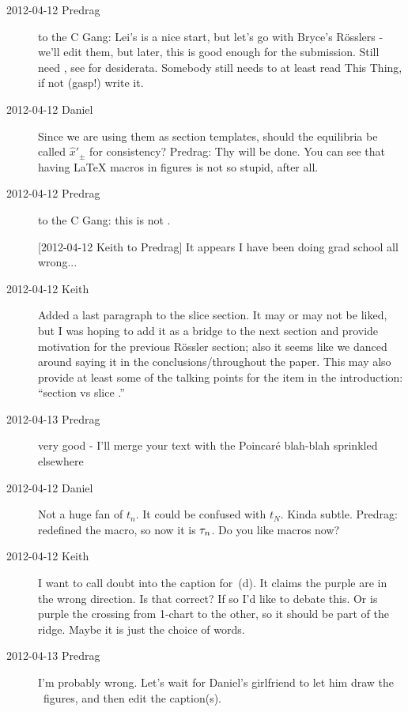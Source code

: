 \begin{description}
\item[2012-04-12 Predrag] to the C Gang: Lei's is a nice start, but let's
go with Bryce's R\"osslers - we'll edit them, but later, this is good
enough for the submission. Still need , see
 for desiderata. Somebody still needs to at least read
This Thing, if not (gasp!) write it.

\item[2012-04-12 Daniel]
    Since we are using them as section templates, should the equilibria
    be called $\hat{x}'_{\pm}$ for consistency? Predrag: Thy will be
    done. You can see that having LaTeX macros in figures is not so
    stupid, after all.

\item[2012-04-12 Predrag] to the C Gang: this is not
.

[2012-04-12 Keith to Predrag] It appears I have been doing grad school
all wrong...

\item[2012-04-12 Keith] Added a last paragraph to the slice section.  It
may or may not be liked, but I was hoping to add it as a bridge to the
next section and provide motivation for the previous R\"ossler section;
also it seems like we danced around saying it in the
conclusions/throughout the paper.  This may also provide at least some of
the talking points for the item in the introduction:
      ``section {\PoincS} vs slice \pSRed.''

\item[2012-04-13 Predrag] very  good - I'll merge your text with the
Poincar\'e blah-blah sprinkled elsewhere

\item[2012-04-12 Daniel] Not a huge fan of $t_n$. It could be confused with
    $t_N$. Kinda subtle. Predrag: redefined the macro, so now it is
    $\tau_n$. Do you like macros now?

\item[2012-04-12 Keith]
I want to call doubt into the caption for \,(d).  It
claims the purple are in the wrong direction.  Is that correct?  If so
I'd like to debate this. Or is purple the crossing from 1-chart to the
other, so it should be part of the ridge. Maybe it is just the choice of
words.

\item[2012-04-13 Predrag]
I'm probably wrong. Let's wait for Daniel's girlfriend to let him draw
the \cLe\ figures, and then edit the caption(s).


\end{description}
